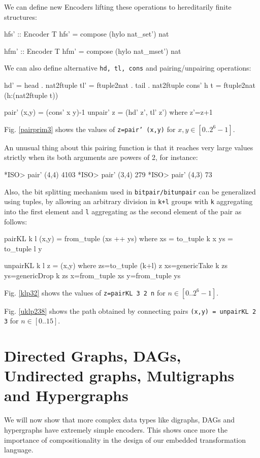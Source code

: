 \documentclass[]{INCLUDES/llncs}
\begin{document}
We can define new Encoders lifting these operations to hereditarily
finite structures:
\begin{code}

hfs' :: Encoder T
hfs' = compose (hylo nat_set') nat

hfm' :: Encoder T
hfm' = compose (hylo nat_mset') nat
\end{code}

We can also define alternative {\tt hd, tl, cons} and pairing/unpairing
operations:
\begin{code}
hd' = head . nat2ftuple
tl' = ftuple2nat . tail . nat2ftuple
cons' h t  = ftuple2nat (h:(nat2ftuple t))

pair' (x,y) = (cons' x y)-1
unpair' z = (hd' z', tl' z') where z'=z+1
\end{code}

Fig. \ref{pairprim3} shows the values of {\tt z=pair' (x,y)} for $x,y \in
[0..2^{6}-1]$.

An unusual thing about this pairing function is that it reaches very
large values strictly when its both arguments are powers of 2, for
instance:
\begin{codex}
*ISO> pair' (4,4)
4103
*ISO> pair' (3,4)
279
*ISO> pair' (4,3)
73
\end{codex}

Also, the bit splitting mechanism used in {\tt bitpair/bitunpair} can be
generalized using tuples, by allowing an arbitrary division in {\tt k+l} groups
with {\tt k} aggregating into the first element and {\tt l} aggregating as the second element of the pair as follows:
\begin{code}
pairKL k l (x,y) = from_tuple (xs ++ ys) where
   xs = to_tuple k x
   ys = to_tuple l y
   
unpairKL k l z = (x,y) where 
  zs=to_tuple (k+l) z
  xs=genericTake k zs
  ys=genericDrop k zs
  x=from_tuple xs
  y=from_tuple ys
\end{code}

Fig. \ref{klp32} shows the values of {\tt z=pairKL 3 2 n} for $n \in
[0..2^{6}-1]$.

Fig. \ref{uklp238} shows the path obtained by connecting pairs
{\tt (x,y) = unpairKL 2 3} for $n \in [0..15]$.

\section{Directed Graphs, DAGs, Undirected graphs, Multigraphs and Hypergraphs}
We will now show that more complex data types like digraphs, DAGs and
hypergraphs have extremely simple encoders. This shows once more the importance
of compositionality in the design of our embedded transformation
language.
\end{document}
